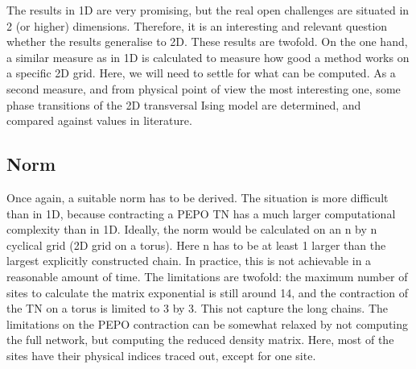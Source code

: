 The results in 1D are very promising, but the real open challenges are situated in 2 (or higher) dimensions. Therefore, it is an interesting and relevant question whether the results generalise to 2D. These results are twofold. On the one hand, a similar measure as in 1D is calculated to measure how good a method works on a specific 2D grid. Here, we will need to settle for what can be computed. As a second measure, and from physical point of view the most interesting one, some phase transitions of the 2D transversal Ising model are determined, and compared against values in literature.

\subsection{Norm}

Once again, a suitable norm has to be derived. The situation is more difficult than in 1D, because contracting a PEPO \Gls{TN} has a much larger computational complexity than in 1D. Ideally, the norm would be calculated on an n by n cyclical grid (2D grid on a torus). Here n has to be at least 1 larger than the largest explicitly constructed chain. In practice, this is not achievable in a reasonable amount of time. The limitations are twofold: the maximum number of sites to calculate the matrix exponential is still around 14, and the contraction of the \Gls{TN} on a torus is limited to 3 by 3. This not capture the long chains.  The limitations on the PEPO contraction can be somewhat relaxed by not computing the full network, but computing the reduced density matrix. Here, most of the sites have their physical indices traced out, except for one site.

